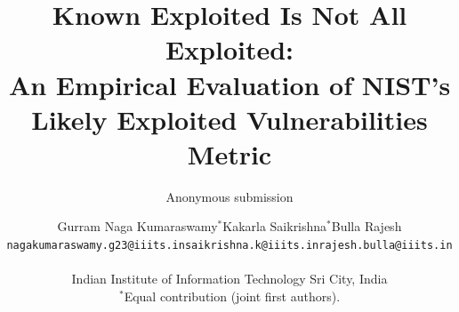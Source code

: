 \documentclass[11pt,letterpaper]{article}
\title{Known Exploited Is Not All Exploited:\\An Empirical Evaluation of NIST's\\Likely Exploited Vulnerabilities Metric}
\author{Anonymous submission}
\author{\begin{tabular}{ccc}
    Gurram Naga Kumaraswamy$^{*}$ & Kakarla Saikrishna$^{*}$ & Bulla Rajesh\\
    \small\texttt{nagakumaraswamy.g23@iiits.in} & \small\texttt{saikrishna.k@iiits.in} &
    \small\texttt{rajesh.bulla@iiits.in}
  \end{tabular}\\[4pt]
  \small Indian Institute of Information Technology Sri City, India\\[2pt]
  \small $^{*}$Equal contribution (joint first authors).}
\begin{document}
\maketitle
\begin{abstract}

\end{abstract}



\appendix

\clearpage  %



\end{document}
